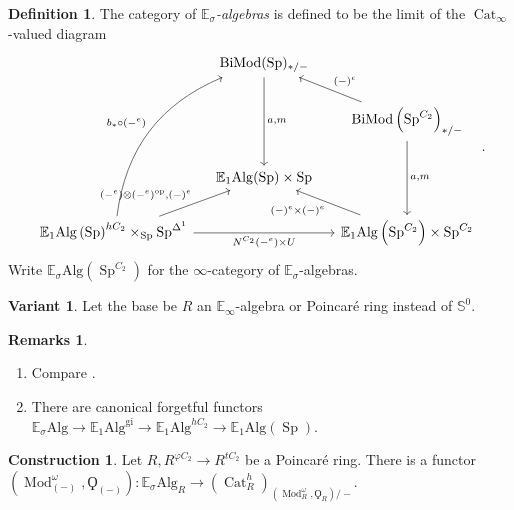 \documentclass{article}
\DeclareMathOperator{\Cat}{Cat} %
\DeclareMathOperator{\Mod}{Mod} %
\DeclareMathOperator{\BiMod}{BiMod} %
\DeclareMathOperator{\Spectra}{Sp} %
\theoremstyle{definition}
\newtheorem{definition}[equation]{Definition}
\newtheorem{construction}[equation]{Construction}
\newtheorem{remarks}[equation]{Remarks}
\newtheorem{variant}[equation]{Variant}
\begin{document}
\begin{definition}
   The category of \emph{$\mathbb{E}_\sigma$-algebras} is defined to be the limit of the $\Cat_\infty$-valued diagram 
   \begin{equation}\label{diagram:E_sigma_alg}
   \begin{tikzcd}[column sep=small]
       & \BiMod(\Spectra)_{*/-} \ar[dd,"{a,m}"]  & \\
       & & \BiMod\left(\Spectra^{C_2}\right)_{*/-} \ar[dd,"{a, m}"] \ar[lu,"{(-)^e}"'] \\
       &\mathbb{E}_1\mathrm{Alg}(\Spectra) \times \Spectra & \\
       \mathbb{E}_1\mathrm{Alg}\left(\Spectra\right)^{hC_2} \times_{\Spectra} \Spectra^{\Delta^1}  \ar[rr,"{N^{C_2}(-^e) \times U}"'] \ar[ru,"{(-^e) \otimes(-^ e)^\mathrm{op}, (-)^e}"] \ar[ruuu,"{b_* \circ (-^e)}", bend left=30] & &\mathbb{E}_1\mathrm{Alg}\left(\Spectra^{C_2}\right) \times \Spectra^{C_2} \ar[lu,"{(-)^e \times (-)^e}"]
   \end{tikzcd}\,.
   \end{equation}   
   Write $ \mathbb{E}_\sigma\mathrm{Alg}\left(\Spectra^{C_2}\right) $ for the $\infty $-category of $\mathbb{E}_\sigma$-algebras. 
\end{definition}
\begin{variant}
   Let the base be $ R $ an $ \mathbb{E}_\infty $-algebra or Poincaré ring instead of $ \mathbb{S}^0 $. 
\end{variant}
\begin{remarks}
\begin{enumerate}
   \item Compare \cite[Corollary 3.10]{AKGH_real_THH}. 
   \item There are canonical forgetful functors $  \mathbb{E}_\sigma\mathrm{Alg} \to \mathbb{E}_1\mathrm{Alg}^{\mathrm{gi}} \to \mathbb{E}_1\mathrm{Alg}^{hC_2} \to \mathbb{E}_1\mathrm{Alg}(\Spectra) $. 
\end{enumerate}
\end{remarks}
\begin{construction}\label{cons:Esigma_alg_to_R_lin_hermitian_cat}
   Let $ R, R^{\varphi C_2} \to R^{tC_2} $ be a Poincaré ring. 
   There is a functor $ \left(\Mod_{(-)}^\omega, \Qoppa_{(-)}\right) \colon \mathbb{E}_\sigma\mathrm{Alg}_R \to \left(\Cat^h_R\right)_{\left(\Mod_R^\omega,\Qoppa_R\right)/-} $. 
\end{construction}
\end{document}

